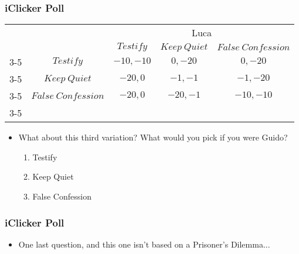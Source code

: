 \begin{frame}
\frametitle{iClicker Poll}
\begin{table}[h]
	\centering
	\begin{tabular}{cc|c|c|c|}
		& \multicolumn{1}{c}{} & \multicolumn{3}{c}{Luca}\\
		& \multicolumn{1}{c}{} & \multicolumn{1}{c}{$Testify$}  & \multicolumn{1}{c}{$Keep~Quiet$} & \multicolumn{1}{c}{$False~Confession$} \\\cline{3-5}
		\multirow{Guido}  & $Testify$ & $-10,-10$ & $0,-20$ & $0, -20$\\\cline{3-5}
		& $Keep~Quiet$ & $-20,0$ & $-1,-1$ & $-1, -20$ \\\cline{3-5}
		& $False~Confession$ & $-20, 0$ & $-20, -1$ & $-10, -10$ \\\cline{3-5}
	\end{tabular}
\end{table}
\begin{itemize}
\item What about this third variation? What would you pick if you were Guido?
\begin{enumerate}
	\item Testify
	\item Keep Quiet
	\item False Confession
\end{enumerate}
\end{itemize}
\end{frame}

\begin{frame}
\frametitle{iClicker Poll}
\begin{itemize}
	\item One last question, and this one isn't based on a Prisoner's Dilemma...
\end{itemize}
\end{frame}

